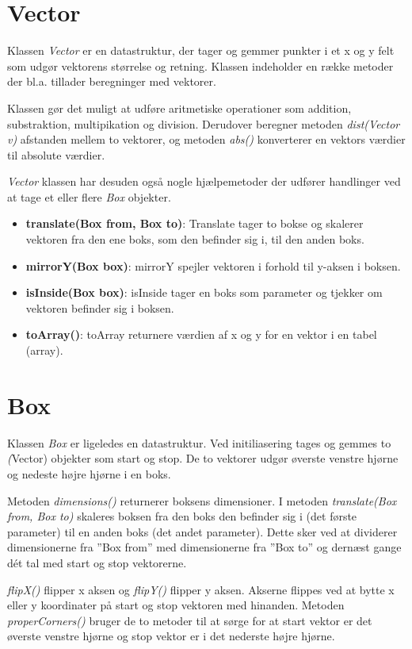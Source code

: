 \section{Vector}

Klassen \emph{Vector} er en datastruktur, der tager og gemmer punkter i et x og y felt som udgør vektorens størrelse og retning. Klassen indeholder en række metoder der bl.a. tillader beregninger med vektorer.

Klassen gør det muligt at udføre aritmetiske operationer som addition, substraktion, multipikation og division. Derudover beregner metoden \emph{dist(Vector v)} afstanden mellem to vektorer, og metoden \emph{abs()} konverterer en vektors værdier til absolute værdier.

\emph{Vector} klassen har desuden også nogle hjælpemetoder der udfører handlinger ved at tage et eller flere \emph{Box} objekter.

\begin{itemize}
	\item \textbf{translate(Box from, Box to)}: Translate tager to bokse og skalerer vektoren fra den ene boks, som den befinder sig i, til den anden boks.
	\item \textbf{mirrorY(Box box)}: mirrorY spejler vektoren i forhold til y-aksen i boksen.
	\item \textbf{isInside(Box box)}: isInside tager en boks som parameter og tjekker om vektoren befinder sig i boksen.
	\item \textbf{toArray()}: toArray returnere værdien af x og y for en vektor i en tabel (array).
\end{itemize}

\section{Box}

Klassen \emph{Box} er ligeledes en datastruktur. Ved initiliasering tages og gemmes to \emph(Vector) objekter som start og stop. De to vektorer udgør øverste venstre hjørne og nedeste højre hjørne i en boks.

Metoden \emph{dimensions()} returnerer boksens dimensioner. I metoden \emph{translate(Box from, Box to)} skaleres boksen fra den boks den befinder sig i (det første parameter) til en anden boks (det andet parameter). Dette sker ved at dividerer dimensionerne fra ''Box from'' med dimensionerne fra ''Box to'' og dernæst gange dét tal med start og stop vektorerne.

\emph{flipX()} flipper x aksen og \emph{flipY()} flipper y aksen. Akserne flippes ved at bytte x eller y koordinater på start og stop vektoren med hinanden. Metoden \emph{properCorners()} bruger de to metoder til at sørge for at start vektor er det øverste venstre hjørne og stop vektor er i det nederste højre hjørne.

